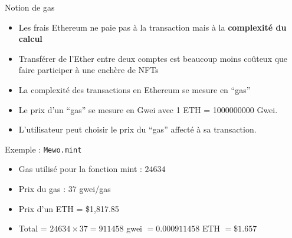 \begin{frame}{Notion de gas}
  \begin{itemize}
    \item Les frais Ethereum ne paie pas à la transaction mais à la \textbf{complexité du calcul}
    \item Transférer de l'Ether entre deux comptes est beaucoup moins coûteux que faire participer à une enchère de NFTs
    \item La complexité des transactions en Ethereum se mesure en \enquote{gas}
    \item Le prix d'un \enquote{gas} se mesure en Gwei avec 1 ETH = 1000000000 Gwei.
    \item L'utilisateur peut choisir le prix du \enquote{gas} affecté à sa transaction.
  \end{itemize}

  \begin{block}{Exemple : \texttt{Mewo.mint}}
    \begin{itemize}
      \item Gas utilisé pour la fonction mint : $24634$
      \item Prix du gas : $37$ gwei/gas
      \item Prix d'un ETH = \$1,817.85
      \item Total = $24634\times37=911458$ gwei $= 0.000911458$ ETH $ = \$1.657$
    \end{itemize}
  \end{block}
\end{frame}
